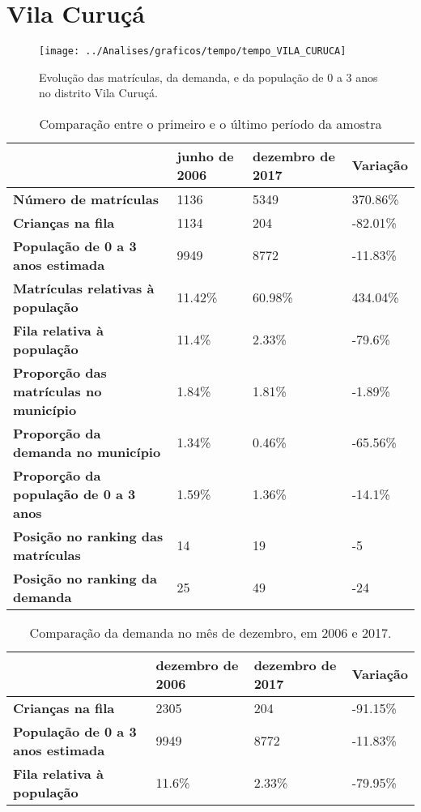 \section{Vila Curuçá}
\begin{figure}[H]
\centering
\texttt{[image: ../Analises/graficos/tempo/tempo\_VILA\_CURUCA]}
\caption{Evolução das matrículas, da demanda, e da população de 0 a 3 anos no distrito Vila Curuçá.}
\end{figure}
\begin{table}[H]
\begin{tabular}{|l|l|l|l|}
\hline
\textbf{}                                      & \textbf{junho de 2006}       & \textbf{dezembro de 2017}    & \textbf{Variação} \\ \hline
\textbf{Número de matrículas}                  & 1136 & 5349 & 370.86\% \\ \hline
\textbf{Crianças na fila}                      & 1134 & 204 & -82.01\% \\ \hline
\textbf{População de 0 a 3 anos estimada}      & 9949 & 8772 & -11.83\% \\ \hline
\textbf{Matrículas relativas à população}      & 11.42\% & 60.98\% & 434.04\% \\ \hline
\textbf{Fila relativa à população}             & 11.4\% & 2.33\% & -79.6\% \\ \hline
\textbf{Proporção das matrículas no município} & 1.84\% & 1.81\% & -1.89\% \\ \hline
\textbf{Proporção da demanda no município}     & 1.34\% & 0.46\% & -65.56\% \\ \hline
\textbf{Proporção da população de 0 a 3 anos}  & 1.59\% & 1.36\% & -14.1\% \\ \hline
\textbf{Posição no ranking das matrículas}     & 14 & 19 & -5 \\ \hline
\textbf{Posição no ranking da demanda}         & 25 & 49 & -24 \\ \hline
\end{tabular}
\caption{Comparação entre o primeiro e o último período da amostra}
\end{table}
\begin{table}[H]
\begin{tabular}{|l|l|l|l|}
\hline
\textbf{}                                 & \textbf{dezembro de 2006} & \textbf{dezembro de 2017} & \textbf{Variação} \\ \hline
\textbf{Crianças na fila}                      & 2305 & 204 & -91.15\% \\ \hline
\textbf{População de 0 a 3 anos estimada}      & 9949 & 8772 & -11.83\% \\ \hline
\textbf{Fila relativa à população}             & 11.6\% & 2.33\% & -79.95\% \\ \hline
\end{tabular}
\caption{Comparação da demanda no mês de dezembro, em 2006 e 2017.}
\end{table}
